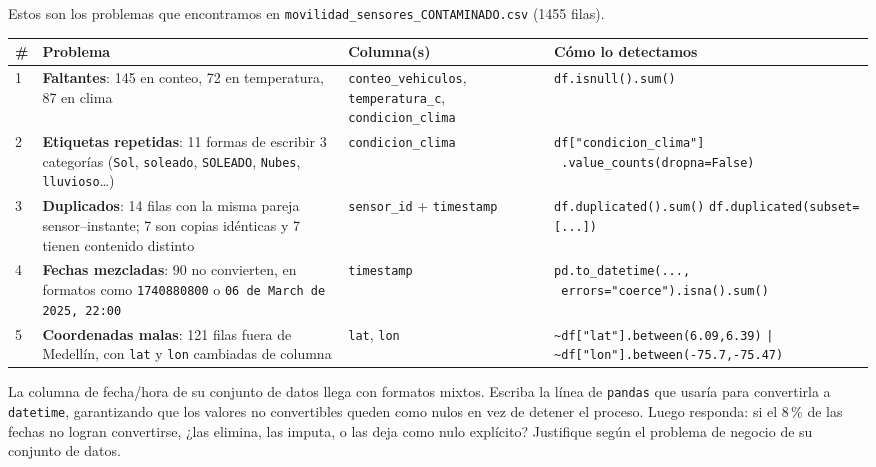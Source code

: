\documentclass[11pt]{article}
\begin{document}
\begin{respuesta}[Respuesta 2.1]
Estos son los problemas que encontramos en \texttt{movilidad\_sensores\_CONTAMINADO.csv} (1455 filas).

{\small
\begin{longtable}{p{0.4cm}p{4.1cm}p{3.2cm}p{6.4cm}}
\toprule
\# & Problema & Columna(s) & Cómo lo detectamos \\
\midrule
1 & \textbf{Faltantes}: 145 en conteo, 72 en temperatura, 87 en clima & \texttt{conteo\_vehiculos}, \texttt{temperatura\_c}, \texttt{condicion\_clima} & \texttt{df.isnull().sum()} \\
2 & \textbf{Etiquetas repetidas}: 11 formas de escribir 3 categorías (\texttt{Sol}, \texttt{soleado}, \texttt{SOLEADO}, \texttt{Nubes}, \texttt{lluvioso}\ldots) & \texttt{condicion\_clima} & \texttt{df["condicion\_clima"]} \newline \texttt{~.value\_counts(dropna=False)} \\
3 & \textbf{Duplicados}: 14 filas con la misma pareja sensor--instante; 7 son copias idénticas y 7 tienen contenido distinto & \texttt{sensor\_id} + \texttt{timestamp} & \texttt{df.duplicated().sum()} \newline \texttt{df.duplicated(subset=[...])} \\
4 & \textbf{Fechas mezcladas}: 90 no convierten, en formatos como \texttt{1740880800} o \texttt{06 de March de 2025, 22:00} & \texttt{timestamp} & \texttt{pd.to\_datetime(...,} \newline \texttt{~errors="coerce").isna().sum()} \\
5 & \textbf{Coordenadas malas}: 121 filas fuera de Medellín, con \texttt{lat} y \texttt{lon} cambiadas de columna & \texttt{lat}, \texttt{lon} & \texttt{\textasciitilde df["lat"].between(6.09,6.39)} \newline \texttt{| \textasciitilde df["lon"].between(-75.7,-75.47)} \\
\bottomrule
\end{longtable}
}

\end{respuesta}


\begin{pregunta}
La columna de fecha/hora de su conjunto de datos llega con formatos mixtos. Escriba la línea de \texttt{pandas} que usaría para convertirla a \texttt{datetime}, garantizando que los valores no convertibles queden como nulos en vez de detener el proceso. Luego responda: si el 8\,\% de las fechas no logran convertirse, ¿las elimina, las imputa, o las deja como nulo explícito? Justifique según el problema de negocio de su conjunto de datos.
\end{pregunta}
\end{document}
